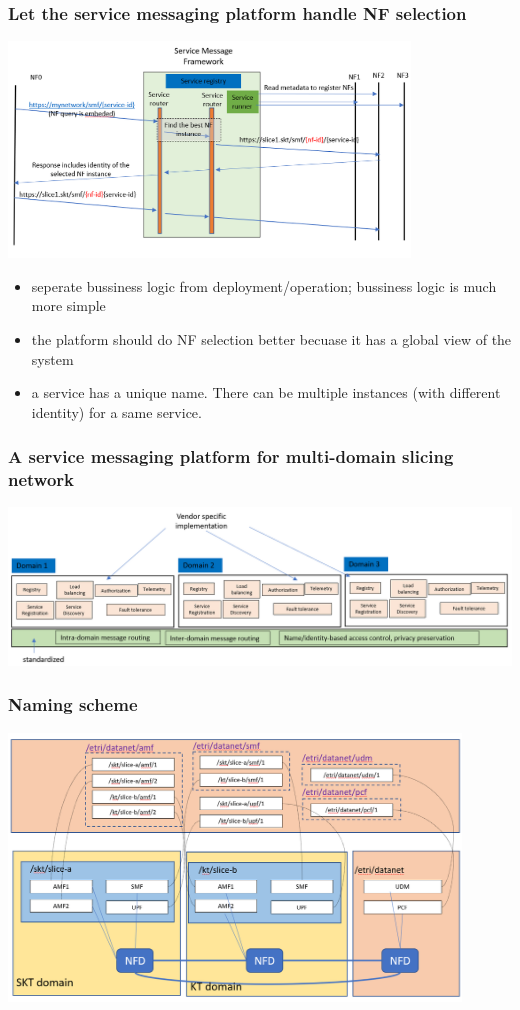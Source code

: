 \documentclass{beamer}
\begin{document}
\begin{frame}
  \frametitle{Let the service messaging platform handle NF selection}
  \begin{center}
    \includegraphics[width=0.8\textwidth]{images/smp}
  \end{center}
  \begin{itemize}
    \item seperate bussiness logic from deployment/operation; bussiness logic is much more simple
    \item the platform should do NF selection better becuase it has a global view of the system
    \item a service has a unique name. There can be multiple instances (with different identity) for a same service.
  \end{itemize}
\end{frame}

\begin{frame}
  \frametitle{A service messaging platform for multi-domain slicing network}
  \begin{center}
    \includegraphics[width=\textwidth]{images/multi-domain-smp}
  \end{center}
\end{frame}

\begin{frame}
  \frametitle{Naming scheme}
  \begin{center}
    \includegraphics[width=0.9\textwidth]{images/slice-naming}
  \end{center}
\end{frame}
\end{document}
